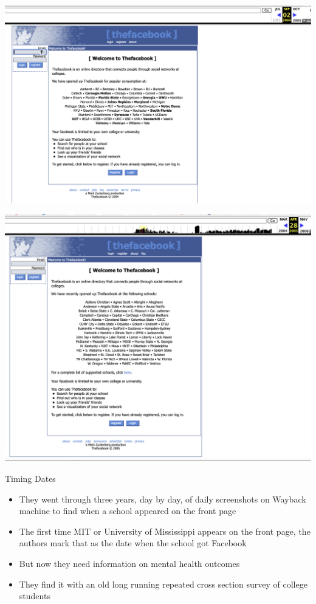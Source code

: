 \documentclass{beamer}
\begin{document}
\begin{frame}
\begin{center}
\includegraphics[scale=0.25]{./lecture_includes/wayback3}
\end{center}
\end{frame}

\begin{frame}
\begin{center}
\includegraphics[scale=0.25]{./lecture_includes/wayback4}
\end{center}
\end{frame}

\begin{frame}{Timing Dates}

\begin{itemize}
\item They went through three years, day by day, of daily screenshots on Wayback machine to find when a school appeared on the front page
\item The first time MIT or University of Mississippi appears on the front page, the authors mark that as the date when the school got Facebook
\item But now they need information on mental health outcomes
\item They find it with an old long running repeated cross section survey of college students
\end{itemize}

\end{frame}
\end{document}
